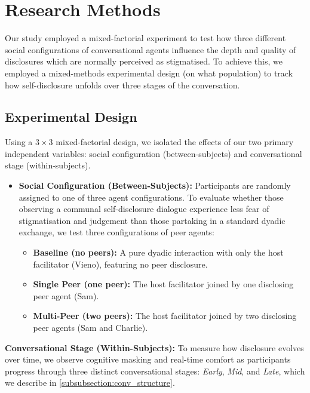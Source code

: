 \documentclass[sigconf]{acmart}
\begin{document}
\section{Research Methods}
Our study employed a mixed-factorial experiment to test how three different social configurations of conversational agents influence the depth and quality of disclosures which are normally perceived as stigmatised. To achieve this, we employed a mixed-methods experimental design (on what population) to track how self-disclosure unfolds over three stages of the conversation.

\subsection{Experimental Design}

Using a $3 \times 3$ mixed-factorial design, we isolated the effects of our two primary independent variables: social configuration (between-subjects) and conversational stage (within-subjects).

\begin{itemize}
    \item \textbf{Social Configuration (Between-Subjects):} Participants are randomly assigned to one of three agent configurations. To evaluate whether those observing a communal self-disclosure dialogue experience less fear of stigmatisation and judgement than  those partaking in a standard dyadic exchange, we test three configurations of peer agents:
    \begin{itemize}
        \item \textbf{Baseline (no peers):} A pure dyadic interaction with only the host facilitator (Vieno), featuring no peer disclosure.
        \item \textbf{Single Peer (one peer):} The host facilitator joined by one disclosing peer agent (Sam).
        \item \textbf{Multi-Peer (two peers):} The host facilitator joined by two disclosing peer agents (Sam and Charlie).
    \end{itemize}
\end{itemize}

\noindent\textbf{Conversational Stage (Within-Subjects):} To measure how disclosure evolves over time, we observe cognitive masking and real-time comfort as participants progress through three distinct conversational stages: \textit{Early}, \textit{Mid}, and \textit{Late}, which we describe in \autoref{subsubsection:conv_structure}. 
\end{document}
